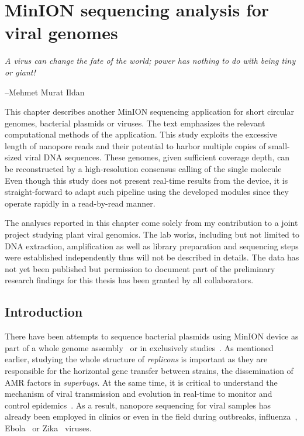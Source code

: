 \chapter{MinION sequencing analysis for viral genomes}\label{ch:concatemers}
\thispagestyle{empty}
\vspace*{\fill}
\epigraph{\emph{A virus can change the fate of the world; power has nothing to do with being tiny or giant!}}
{--Mehmet Murat Ildan}

\clearpage

This chapter describes another MinION sequencing application for short circular genomes, \EG{} bacterial plasmids or viruses. The text emphasizes the relevant computational methods of the application. 
This study exploits the excessive length of nanopore reads and their potential to harbor multiple copies of small-sized viral DNA sequences. These genomes, given sufficient coverage depth, can be reconstructed by a high-resolution consensus calling of the single molecule 
Even though this study does not present real-time results from the device, it is straight-forward to adapt such pipeline using the developed modules since they operate rapidly in a read-by-read manner.

The analyses reported in this chapter come solely from my contribution to a joint project studying plant viral genomics. 
The lab works, including but not limited to DNA extraction, amplification as well as library preparation and sequencing steps were established independently thus will not be described in details.
The data has not yet been published but permission to document part of the preliminary research findings for this thesis has been granted by all collaborators.
\section{Introduction}
There have been attempts to sequence bacterial plasmids using MinION device as part of a whole genome assembly~\cite{Lemon2017M15,Wick2017M12} or in exclusively studies~\cite{Li2018M13,Lu2018plamids}. As mentioned earlier, studying the whole structure of \emph{replicons} is important as they are responsible for the horizontal gene transfer between strains, \EG{} the dissemination of AMR factors in \emph{superbugs}.
At the same time, it is critical to understand the mechanism of viral transmission and evolution in real-time to monitor and control  epidemics~\cite{GardyLR2015,AndersenSM2015,HolmesDR2016,DudasCB2017}.
As a result, nanopore sequencing for viral samples has already been employed in clinics or even in the field during outbreaks, \EG{} influenza~\cite{Wang2015minion}, Ebola~\cite{QuickLD2016} or Zika~\cite{Quick2017GP} viruses.


